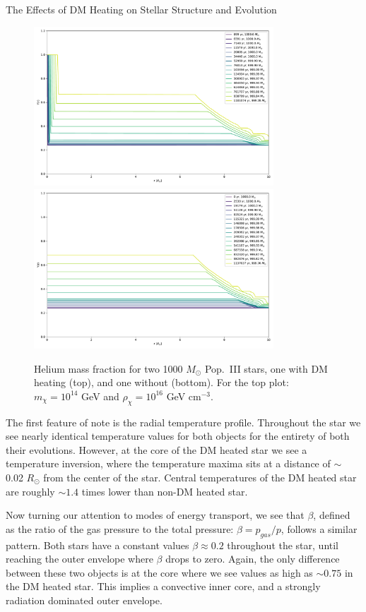 \documentclass[a4paper,11pt]{article}
\begin{document}
\begin{section}{The Effects of DM Heating on Stellar Structure and Evolution}
    \begin{figure}
        \centering
        \includegraphics[width=0.8\textwidth]{Yfrac_DM.pdf}
        \includegraphics[width=0.8\textwidth]{Yfrac_noDM.pdf}
        \caption{Helium mass fraction for two 1000 $M_\odot$ Pop.~III stars, one with DM heating (top), and one without (bottom). For the top plot: $m_\chi = 10^{14}$ GeV and $\rho_\chi = 10^{16}$ GeV cm$^{-3}$.}
    \end{figure}

    The first feature of note is the radial temperature profile.
    Throughout the star we see nearly identical temperature values for both objects for the entirety of both their evolutions.
    However, at the core of the DM heated star we see a temperature inversion, where the temperature maxima sits at a distance of $\sim$ 0.02 $R_\odot$ from the center of the star.
    Central temperatures of the DM heated star are roughly $\sim 1.4$ times lower than non-DM heated star.

    Now turning our attention to modes of energy transport, we see that $\beta$, defined as the ratio of the gas pressure to the total pressure: $\beta = p_{gas} / p$, follows a similar pattern.
    Both stars have a constant values $\beta \approx 0.2$ throughout the star, until reaching the outer envelope where $\beta$ drops to zero.
    Again, the only difference between these two objects is at the core where we see values as high as $\sim 0.75$ in the DM heated star.
    This implies a convective inner core, and a strongly radiation dominated outer envelope.


\end{section}
\end{document}
